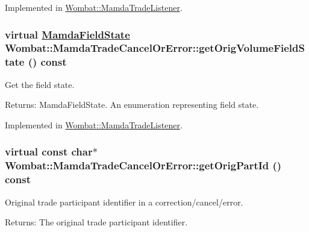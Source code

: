 Implemented in \hyperlink{classWombat_1_1MamdaTradeListener_0e179272d95923e3da5df3bf67bfb643}{Wombat::Mamda\-Trade\-Listener}.\hypertarget{classWombat_1_1MamdaTradeCancelOrError_c23958d17e2f14b4e29d7e360be35098}{
\subsubsection[getOrigVolumeFieldState]{\setlength{\rightskip}{0pt plus 5cm}virtual \hyperlink{namespaceWombat_93aac974f2ab713554fd12a1fa3b7d2a}{Mamda\-Field\-State} Wombat::Mamda\-Trade\-Cancel\-Or\-Error::get\-Orig\-Volume\-Field\-State () const}}
\label{classWombat_1_1MamdaTradeCancelOrError_c23958d17e2f14b4e29d7e360be35098}


Get the field state. 

\begin{Desc}
\item[Returns:]Mamda\-Field\-State. An enumeration representing field state. \end{Desc}


Implemented in \hyperlink{classWombat_1_1MamdaTradeListener_359006736d830e51323d578d45f7adc7}{Wombat::Mamda\-Trade\-Listener}.\hypertarget{classWombat_1_1MamdaTradeCancelOrError_081cabbd540153e1d7ac93b927ff3542}{
\subsubsection[getOrigPartId]{\setlength{\rightskip}{0pt plus 5cm}virtual const char$\ast$ Wombat::Mamda\-Trade\-Cancel\-Or\-Error::get\-Orig\-Part\-Id () const}}
\label{classWombat_1_1MamdaTradeCancelOrError_081cabbd540153e1d7ac93b927ff3542}


Original trade participant identifier in a correction/cancel/error. 

\begin{Desc}
\item[Returns:]The original trade participant identifier. \end{Desc}


